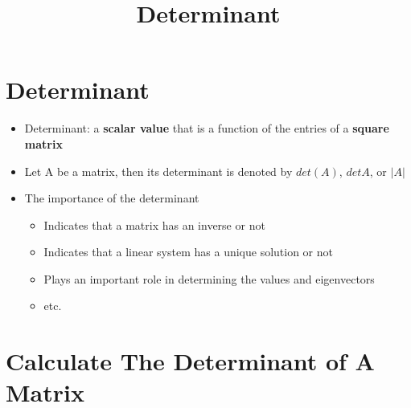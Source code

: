 \documentclass[a4paper,12pt]{article}
\begin{document}
\title{Determinant}

\section*{Determinant}
\begin{itemize}
  \item Determinant: a \textbf{scalar value} that is a function of the entries of a \textbf{square matrix}
  \item Let A be a matrix, then its determinant is denoted by \(det(A)\), \(det A\), or \(|A|\)
  \item The importance of the determinant
        \begin{itemize}
          \item Indicates that a matrix has an inverse or not
          \item Indicates that a linear system has a unique solution or not
          \item Plays an important role in determining the values and eigenvectors
          \item etc.
        \end{itemize}
\end{itemize}

\section*{Calculate The Determinant of A Matrix}
\end{document}
